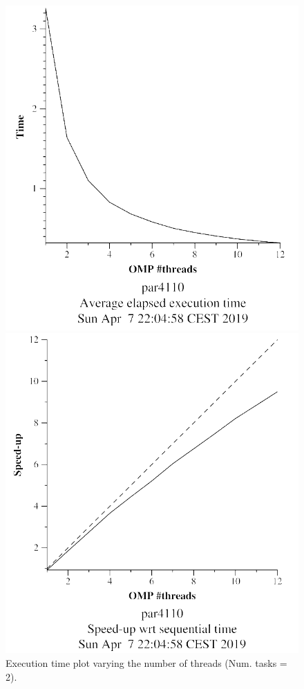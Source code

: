 \documentclass[12pt, a4paper]{article}
\begin{document}
\begin{figure}[H]
\centering
\begin{minipage}[b]{0.4\linewidth}
  \centering
  \includegraphics[scale=0.5]{./mandel-omp-10000-strong-omp-24-2-time}
  \caption{Execution time plot varying the number of threads (Num. tasks = 2).}
  \label{fig:mandel-omp-10000-strong-omp-24-2-time}
\end{minipage}%
\hspace{0.5cm}
\begin{minipage}[b]{0.4\linewidth}
  \centering
  \includegraphics[scale=0.5]{./mandel-omp-10000-strong-omp-24-2-speedup}

\end{minipage}
\end{figure}
\end{document}

